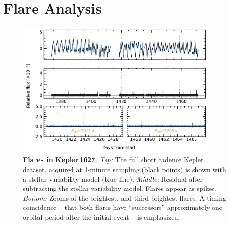 \documentclass[12pt,modern,twocolumn,tighten]{aastex63}
\begin{document}
\section{Flare Analysis}
\label{app:flare}

\begin{figure}[t]
	\begin{center}
		\leavevmode
		\includegraphics[width=0.9\textwidth]{f7.pdf}
	\end{center}
	\vspace{-0.7cm}
	\caption{
		{\bf Flares in Kepler\,1627}.  
    {\it Top:}
    The full short cadence Kepler dataset, acquired at 1-minute
    sampling (black points) is shown with a stellar variability model
    (blue line).
    {\it Middle:}
    Residual after subtracting the stellar variability model.  Flares
    appear as spikes.
    {\it Bottom:}
    Zooms of the brightest, and third-brightest flares.  A timing
    coincidence -- that both flares have ``successors'' approximately
    one orbital period after the initial event -- is emphasized.
		\label{fig:flarezoom}
	}
\end{figure}
\end{document}

